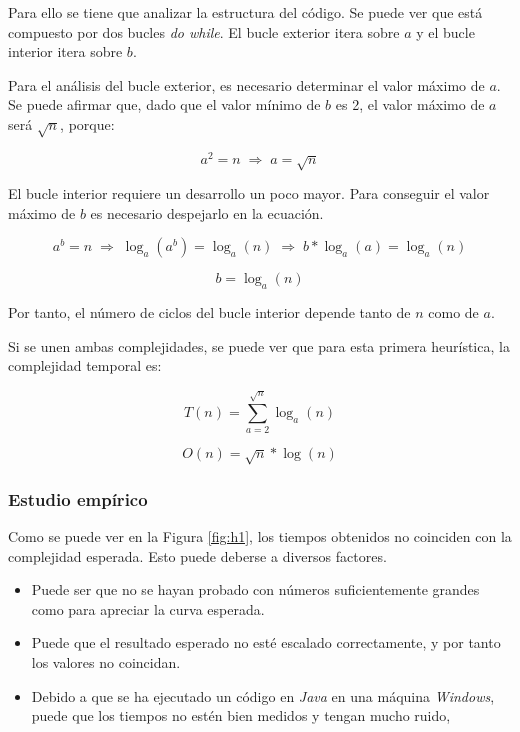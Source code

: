\documentclass{uc3mpracticas}
\begin{document}
\vspace{2mm}

Para ello se tiene que analizar la estructura del código. Se puede ver que está compuesto por dos bucles \textit{do while}. El bucle exterior itera sobre $a$ y el bucle interior itera sobre $b$.

\vspace{2mm}

Para el análisis del bucle exterior, es necesario determinar el valor máximo de $a$.
Se puede afirmar que, dado que el valor mínimo de $b$ es 2, el valor máximo de $a$ será $\sqrt{n}$, porque:

$$ a^2 = n \; \Rightarrow \; a = \sqrt{n} $$

El bucle interior requiere un desarrollo un poco mayor. Para conseguir el valor máximo de $b$ es necesario despejarlo en la ecuación.

\vspace{2mm}

$$ a^b = n \; \Rightarrow \; \log_a(a^b) = \log_a(n)  \; \Rightarrow \; b*\log_a(a) = \log_a(n)$$

$$ b = \log_a(n) $$

Por tanto, el número de ciclos del bucle interior depende tanto de $n$ como de $a$.

\vspace{2mm}

Si se unen ambas complejidades, se puede ver que para esta primera heurística, la complejidad temporal es:

$$ T(n) = \displaystyle \sum_{a=2}^{\sqrt{n}} \log_a(n)$$

$$ O(n) = \sqrt{n} * \log(n)$$


\subsubsection{Estudio empírico}\label{empirico}

Como se puede ver en la Figura \ref{fig:h1}, los tiempos obtenidos no coinciden con la complejidad esperada. Esto puede deberse a diversos factores.

\begin{itemize}
  \item Puede ser que no se hayan probado con números suficientemente grandes como para apreciar la curva esperada.
  \item Puede que el resultado esperado no esté escalado correctamente, y por tanto los valores no coincidan.
  \item Debido a que se ha ejecutado un código en \textit{Java} en una máquina \textit{Windows}, puede que los tiempos no estén bien medidos y tengan mucho ruido,
\end{itemize}
\end{document}
